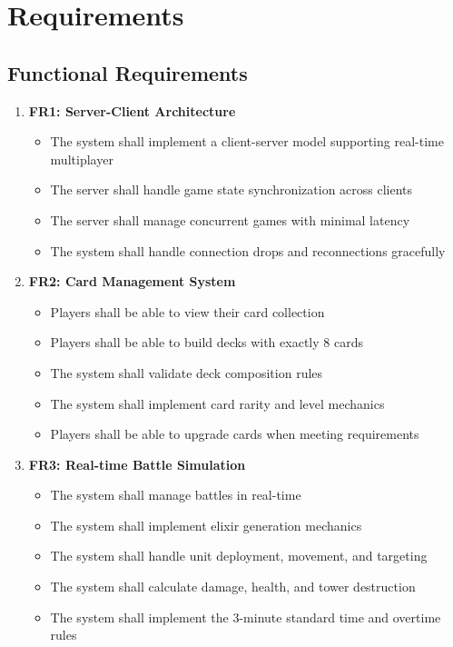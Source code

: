 \documentclass{article}
\begin{document}
\section{Requirements}

\subsection{Functional Requirements}

\begin{enumerate}
    \item \textbf{FR1: Server-Client Architecture}
    \begin{itemize}
        \item The system shall implement a client-server model supporting real-time multiplayer
        \item The server shall handle game state synchronization across clients
        \item The server shall manage concurrent games with minimal latency
        \item The system shall handle connection drops and reconnections gracefully
    \end{itemize}

    \item \textbf{FR2: Card Management System}
    \begin{itemize}
        \item Players shall be able to view their card collection
        \item Players shall be able to build decks with exactly 8 cards
        \item The system shall validate deck composition rules
        \item The system shall implement card rarity and level mechanics
        \item Players shall be able to upgrade cards when meeting requirements
    \end{itemize}

    \item \textbf{FR3: Real-time Battle Simulation}
    \begin{itemize}
        \item The system shall manage battles in real-time
        \item The system shall implement elixir generation mechanics
        \item The system shall handle unit deployment, movement, and targeting
        \item The system shall calculate damage, health, and tower destruction
        \item The system shall implement the 3-minute standard time and overtime rules
    \end{itemize}


\end{enumerate}
\end{document}
